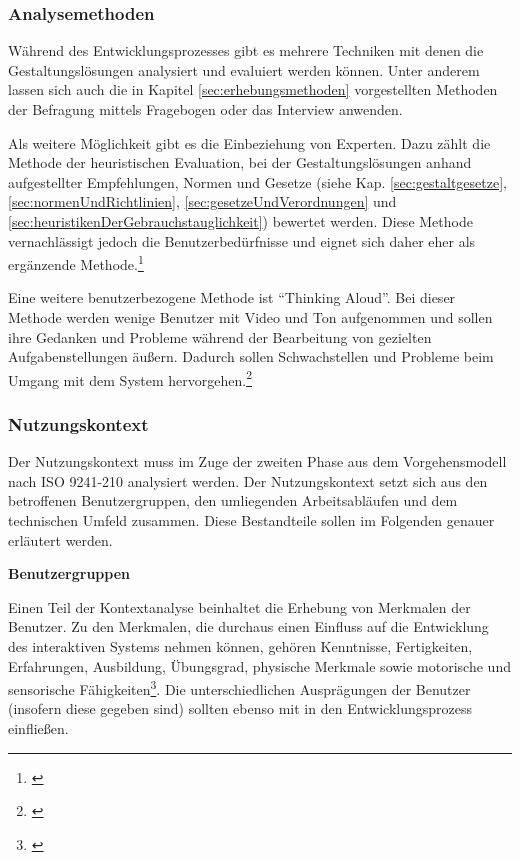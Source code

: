 \subsubsection{Analysemethoden}
\label{sec:analysemethoden}
Während des Entwicklungsprozesses gibt es mehrere Techniken mit denen die Gestaltungslösungen analysiert und evaluiert werden können. Unter anderem lassen sich auch die in Kapitel \ref{sec:erhebungsmethoden} vorgestellten Methoden der Befragung mittels Fragebogen oder das Interview anwenden. 

Als weitere Möglichkeit gibt es die Einbeziehung von Experten. Dazu zählt die Methode der heuristischen Evaluation, bei der Gestaltungslösungen anhand aufgestellter Empfehlungen, Normen und Gesetze (siehe Kap. \ref{sec:gestaltgesetze}, \ref{sec:normenUndRichtlinien}, \ref{sec:gesetzeUndVerordnungen} und \ref{sec:heuristikenDerGebrauchstauglichkeit}) bewertet werden. Diese Methode vernachlässigt jedoch die Benutzerbedürfnisse und eignet sich daher eher als ergänzende Methode.\footnote{\cite[vgl.][249]{Nielsen1990}}

Eine weitere benutzerbezogene Methode ist \enquote{Thinking Aloud}. Bei dieser Methode werden wenige Benutzer mit Video und Ton aufgenommen und sollen ihre Gedanken und Probleme während der Bearbeitung von gezielten Aufgabenstellungen äußern. Dadurch sollen Schwachstellen und Probleme beim Umgang mit dem System hervorgehen.\footnote{\cite[vgl.][51]{Hegner2003}}


\subsubsection{Nutzungskontext}
Der Nutzungskontext muss im Zuge der zweiten Phase aus dem Vorgehensmodell nach ISO 9241-210 analysiert werden. Der Nutzungskontext setzt sich aus den betroffenen Benutzergruppen, den umliegenden Arbeitsabläufen und dem technischen Umfeld zusammen. Diese Bestandteile sollen im Folgenden genauer erläutert werden.

\textbf{Benutzergruppen}

Einen Teil der Kontextanalyse beinhaltet die Erhebung von Merkmalen der Benutzer. Zu den Merkmalen, die durchaus einen Einfluss auf die Entwicklung des interaktiven Systems nehmen können, gehören Kenntnisse, Fertigkeiten, Erfahrungen, Ausbildung, Übungsgrad, physische Merkmale sowie motorische und sensorische Fähigkeiten\footnote{\cite[vgl.][28]{Ecker2016}}. Die unterschiedlichen Ausprägungen der Benutzer (insofern diese gegeben sind) sollten ebenso mit in den Entwicklungsprozess einfließen.


